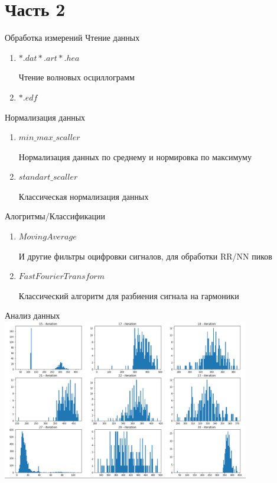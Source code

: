 \documentclass[xcolor=table]{beamer}
\begin{document}
\section{Часть 2}
\begin{frame}{Обработка измерений}
Чтение данных 
\begin{enumerate}
    \item $*.dat *.art *.hea$
    
    Чтение волновых осциллограмм
    
    \item $*.edf$

\end{enumerate}

Нормализация данных
\begin{enumerate}
    \item $min\_max\_scaller$

    Нормализация данных по среднему и нормировка по максимуму
    
    \item $standart\_scaller$

    Классическая нормализация данных
    
\end{enumerate}

Алогритмы/Классификации
\begin{enumerate}
    \item $Moving Average$
    
    И другие фильтры оцифровки сигналов, для обработки RR/NN пиков
    
    \item $Fast Fourier Transform$

    Классический алгоритм для разбиения сигнала на гармоники
    
\end{enumerate}


\end{frame}

\begin{frame}{Анализ данных}
\centering
\includegraphics[height=7cm]{Распределение3.png}
\end{frame}
\end{document}
